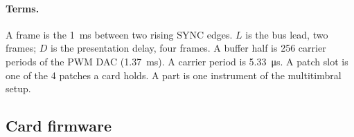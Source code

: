 \paragraph{Terms.} A frame is the \SI{1}{ms} between two rising SYNC edges. $L$ is the bus lead, two frames; $D$
is the presentation delay, four frames. A buffer half is 256 carrier periods of the PWM DAC (\SI{1.37}{ms}). A carrier
period is \SI{5.33}{\micro s}. A patch slot is one of the 4 patches a card holds. A part is one instrument of the
multitimbral setup.

\subsection{Card firmware}\label{sec:srscf}

